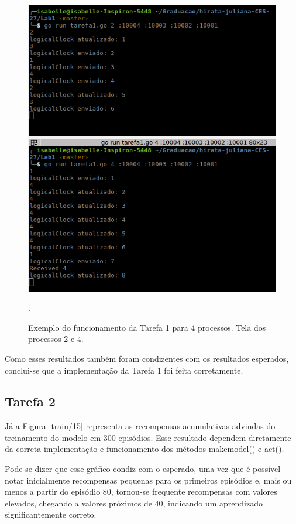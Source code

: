 \documentclass[conference]{IEEEtran}
\begin{document}
\begin{figure}[H]
\centering
\centerline{\includegraphics[scale=0.4]{imagens/tarefa1-testecriado-2.png}}
\caption{Exemplo do funcionamento da Tarefa 1 para 4 processos. Tela dos processos 2 e 4.}.
\label{tarefa1-testecriado-2}
\end{figure}

	Como esses resultados também foram condizentes com os resultados esperados, conclui-se que a implementação da Tarefa 1 foi feita corretamente.

\subsection{Tarefa 2}

	Já a Figura \ref{train/15} representa as recompensas acumulativas advindas do treinamento do modelo em 300 episódios. Esse resultado dependem diretamente da correta implementação e funcionamento dos métodos make\underline{\space}model() e act().
	
	Pode-se dizer que esse gráfico condiz com o esperado, uma vez que é possível notar inicialmente recompensas pequenas para os primeiros episódios e, mais ou menos a partir do episódio 80, tornou-se frequente recompensas com valores elevados, chegando a valores próximos de 40, indicando um aprendizado significantemente correto.
\end{document}
